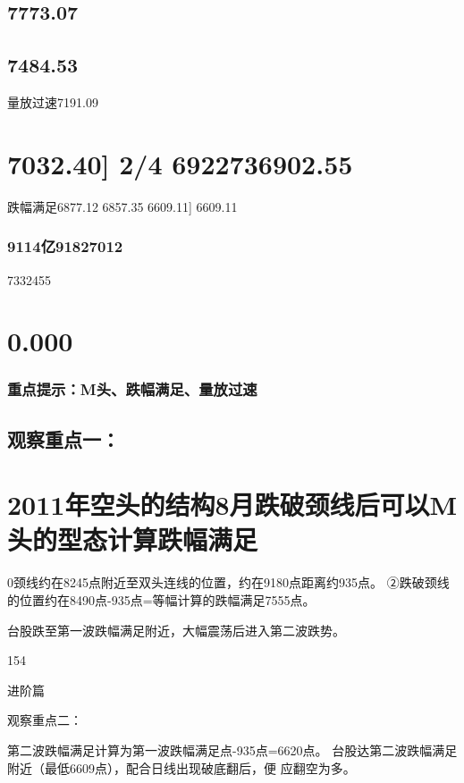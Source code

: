 \documentclass{article}
\begin{document}
\subsection{7773.07}

\subsection{7484.53}

量放过速7191.09

\section{7032.40] 2/4 6922736902.55}

跌幅满足6877.12 6857.35 6609.11] 6609.11

\subsubsection{9114亿91827012}

7332455

\section{0.000}

\subsubsection{重点提示：M头、跌幅满足、量放过速}

\subsection{观察重点一：}

\section{2011年空头的结构8月跌破颈线后可以M头的型态计算跌幅满足}

0颈线约在8245点附近至双头连线的位置，约在9180点距离约935点。 ②跌破颈线的位置约在8490点-935点=等幅计算的跌幅满足7555点。

台股跌至第一波跌幅满足附近，大幅震荡后进入第二波跌势。

154

\clearpage

进阶篇

观察重点二：

第二波跌幅满足计算为第一波跌幅满足点-935点=6620点。 台股达第二波跌幅满足附近（最低6609点），配合日线出现破底翻后，便 应翻空为多。
\end{document}

